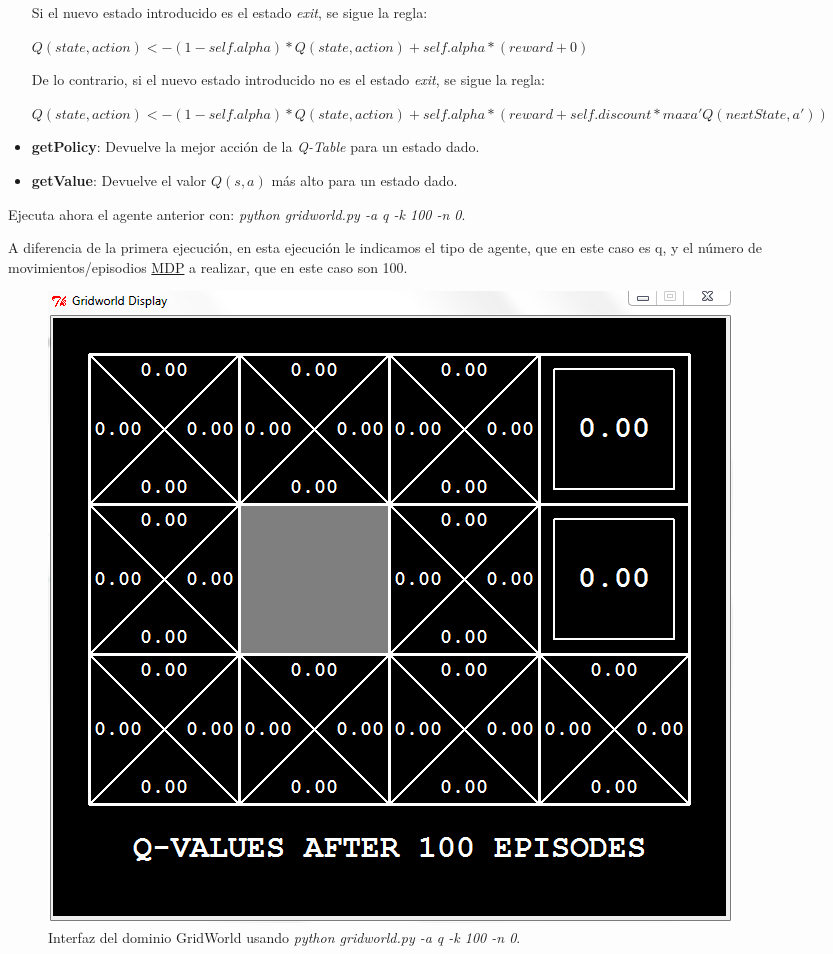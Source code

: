 \documentclass[11pt]{exam}
\begin{document}
\begin{questions}
\begin{itemize}
	Si el nuevo estado introducido es el estado \textit{exit}, se sigue la regla:
	
	\begin{center}
		$Q(state,action) <- (1-self.alpha) * Q(state,action) + self.alpha * (reward + 0)$
	\end{center}

	De lo contrario, si el nuevo estado introducido no es el estado \textit{exit}, se sigue la regla:
	
	\begin{center}
		$Q(state,action) <- (1-self.alpha) * Q(state,action) + self.alpha * (reward + self.discount * max a' Q(nextState, a'))$
	\end{center}
	
	\item \textbf{getPolicy}: Devuelve la mejor acción de la \textit{Q-Table} para un estado dado.
	
	\item \textbf{getValue}: Devuelve el valor $Q(s,a)$ más alto para un estado dado.
		
\end{itemize}

{ \question Ejecuta ahora el agente anterior con: \textit{python gridworld.py -a q -k 100 -n 0}.}

A diferencia de la primera ejecución, en esta ejecución le indicamos el tipo de agente, que en este caso es q, y el número de movimientos/episodios \href{https://en.wikipedia.org/wiki/Markov_decision_process}{MDP} a realizar, que en este caso son 100.

\begin{figure}[h]
	\centering
	\includegraphics[scale=0.5]{image_2}
	\caption{Interfaz del dominio GridWorld usando \textit{python gridworld.py -a q -k 100 -n 0}.}
	\label{image_2}
\end{figure}


\end{questions}
\end{document}

